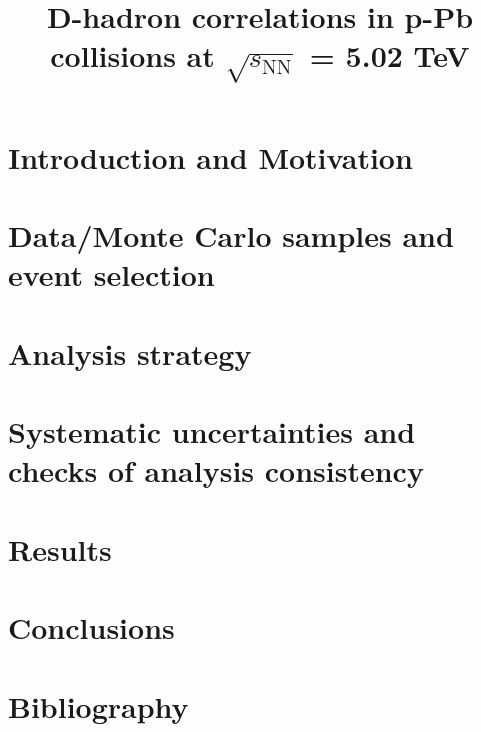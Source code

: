 \documentclass[ALICE,manyauthors]{cernphprep}
\begin{document}
\begin{titlepage}


\PHdate{\today}              %

\title{D-hadron correlations  in p-Pb collisions at $\sqrt{s_\mathrm{NN}}$ = 5.02 TeV}

%




\end{titlepage}

\linenumbers
\tableofcontents

\newpage
\section{Introduction and Motivation}


\newpage
\section{Data/Monte Carlo samples and event selection}


\newpage
\section{Analysis strategy}


\newpage
\section{Systematic uncertainties and checks of analysis consistency}
%

\newpage
\section{Results}


\newpage
\section{Conclusions}


%

\newpage
\section{Bibliography}

\end{document}
